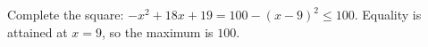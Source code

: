 Complete the square: $-x^2+18x+19=100-(x-9)^2\le100$. Equality is attained at $x=9$, so the maximum is $\boxed{100}$.
